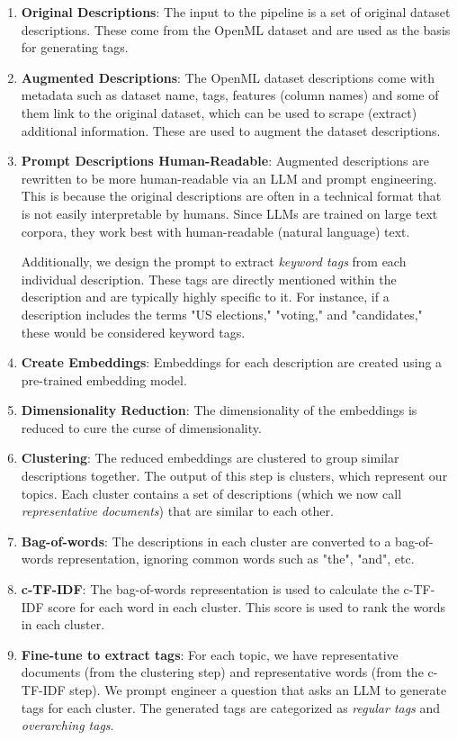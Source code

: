 \begin{enumerate}
    \item \textbf{Original Descriptions}: The input to the pipeline is a set of original dataset descriptions. These come from the OpenML dataset and are used as the basis for generating tags.
    \item \textbf{Augmented Descriptions}: The OpenML dataset descriptions come with metadata such as dataset name, tags, features (column names) and some of them link to the original dataset, which can be used to scrape (extract) additional information. These are used to augment the dataset descriptions.
    \item \textbf{Prompt Descriptions Human-Readable}: Augmented descriptions are rewritten to be more human-readable via an LLM and prompt engineering. This is because the original descriptions are often in a technical format that is not easily interpretable by humans. Since LLMs are trained on large text corpora, they work best with human-readable (natural language) text.
    
    Additionally, we design the prompt to extract \textit{keyword tags} from each individual description. These tags are directly mentioned within the description and are typically highly specific to it. For instance, if a description includes the terms "US elections," "voting," and "candidates," these would be considered keyword tags.

    \item \textbf{Create Embeddings}: Embeddings for each description are created using a pre-trained embedding model.
    \item \textbf{Dimensionality Reduction}: The dimensionality of the embeddings is reduced to cure the curse of dimensionality.
    \item \textbf{Clustering}: The reduced embeddings are clustered to group similar descriptions together. The output of this step is clusters, which represent our topics. Each cluster contains a set of descriptions (which we now call \textit{representative documents}) that are similar to each other.
    \item \textbf{Bag-of-words}: The descriptions in each cluster are converted to a bag-of-words representation, ignoring common words such as "the", "and", etc.
    \item \textbf{c-TF-IDF}: The bag-of-words representation is used to calculate the c-TF-IDF score for each word in each cluster. This score is used to rank the words in each cluster.
    \item \textbf{Fine-tune to extract tags}: For each topic, we have representative documents (from the clustering step) and representative words (from the c-TF-IDF step). We prompt engineer a question that asks an LLM to generate tags for each cluster. The generated tags are categorized as \textit{regular tags} and \textit{overarching tags}.


\end{enumerate}
